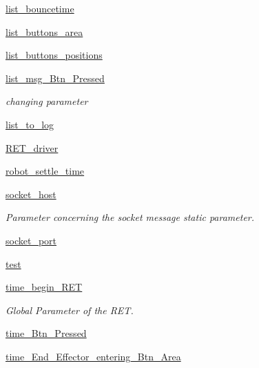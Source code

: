 \begin{DoxyCompactItemize}
\item 
\hyperlink{classRET__Parameter_1_1RET__Parameter_a19e1c5b8812bb41ecaa59c174a9cc027}{list\+\_\+bouncetime}
\item 
\hyperlink{classRET__Parameter_1_1RET__Parameter_ac4848af5696d2d98e426d3d775d6964d}{list\+\_\+buttons\+\_\+area}
\item 
\hyperlink{classRET__Parameter_1_1RET__Parameter_ae07c53483c9c3ff8611ec4d7401fa71f}{list\+\_\+buttons\+\_\+positions}
\item 
\hyperlink{classRET__Parameter_1_1RET__Parameter_a356b7bcae5e020489b6db1128e16d11b}{list\+\_\+msg\+\_\+\+Btn\+\_\+\+Pressed}
\begin{DoxyCompactList}\small\item\em changing parameter \end{DoxyCompactList}\item 
\hyperlink{classRET__Parameter_1_1RET__Parameter_af4093e533290b780aa3d5611f6a8a526}{list\+\_\+to\+\_\+log}
\item 
\hyperlink{classRET__Parameter_1_1RET__Parameter_accada53c1f876f08e9c5beb661846ca1}{R\+E\+T\+\_\+driver}
\item 
\hyperlink{classRET__Parameter_1_1RET__Parameter_a153ea6721b57c14eea55728d46eae779}{robot\+\_\+settle\+\_\+time}
\item 
\hyperlink{classRET__Parameter_1_1RET__Parameter_afc570ca4c1952bb0a14a0511160df54a}{socket\+\_\+host}
\begin{DoxyCompactList}\small\item\em Parameter concerning the socket message static parameter. \end{DoxyCompactList}\item 
\hyperlink{classRET__Parameter_1_1RET__Parameter_a736f9eb916b0d398d68fc3e0c8f3f953}{socket\+\_\+port}
\item 
\hyperlink{classRET__Parameter_1_1RET__Parameter_a05a671c66aefea124cc08b76ea6d30bb}{test}
\item 
\hyperlink{classRET__Parameter_1_1RET__Parameter_a0fc681ced6250a0d860270ba7db63e5a}{time\+\_\+begin\+\_\+\+R\+ET}
\begin{DoxyCompactList}\small\item\em Global Parameter of the R\+ET. \end{DoxyCompactList}\item 
\hyperlink{classRET__Parameter_1_1RET__Parameter_aeb9535b7bbd9a71cd537b64de9a114f2}{time\+\_\+\+Btn\+\_\+\+Pressed}
\item 
\hyperlink{classRET__Parameter_1_1RET__Parameter_a1dbe7829bfc697ea985c80c74990e641}{time\+\_\+\+End\+\_\+\+Effector\+\_\+entering\+\_\+\+Btn\+\_\+\+Area}

\end{DoxyCompactItemize}
